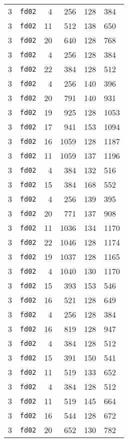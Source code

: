 \documentclass{article}
\begin{document}
\begin{table}[h!]
\begin{tabular}{llrrrl}
    3 & \texttt{fd02} & 4 & 256 & 128 & 384 \\
    3 & \texttt{fd02} & 11 & 512 & 138 & 650 \\
    3 & \texttt{fd02} & 20 & 640 & 128 & 768 \\
    3 & \texttt{fd02} & 4 & 256 & 128 & 384 \\
    3 & \texttt{fd02} & 22 & 384 & 128 & 512 \\
    3 & \texttt{fd02} & 4 & 256 & 140 & 396 \\
    3 & \texttt{fd02} & 20 & 791 & 140 & 931 \\
    3 & \texttt{fd02} & 19 & 925 & 128 & 1053 \\
    3 & \texttt{fd02} & 17 & 941 & 153 & 1094 \\
    3 & \texttt{fd02} & 16 & 1059 & 128 & 1187 \\
    3 & \texttt{fd02} & 11 & 1059 & 137 & 1196 \\
    3 & \texttt{fd02} & 4 & 384 & 132 & 516 \\
    3 & \texttt{fd02} & 15 & 384 & 168 & 552 \\
    3 & \texttt{fd02} & 4 & 256 & 139 & 395 \\
    3 & \texttt{fd02} & 20 & 771 & 137 & 908 \\
    3 & \texttt{fd02} & 11 & 1036 & 134 & 1170 \\
    3 & \texttt{fd02} & 22 & 1046 & 128 & 1174 \\
    3 & \texttt{fd02} & 19 & 1037 & 128 & 1165 \\
    3 & \texttt{fd02} & 4 & 1040 & 130 & 1170 \\
    3 & \texttt{fd02} & 15 & 393 & 153 & 546 \\
    3 & \texttt{fd02} & 16 & 521 & 128 & 649 \\
    3 & \texttt{fd02} & 4 & 256 & 128 & 384 \\
    3 & \texttt{fd02} & 16 & 819 & 128 & 947 \\
    3 & \texttt{fd02} & 4 & 384 & 128 & 512 \\
    3 & \texttt{fd02} & 15 & 391 & 150 & 541 \\
    3 & \texttt{fd02} & 11 & 519 & 133 & 652 \\
    3 & \texttt{fd02} & 4 & 384 & 128 & 512 \\
    3 & \texttt{fd02} & 11 & 519 & 145 & 664 \\
    3 & \texttt{fd02} & 16 & 544 & 128 & 672 \\
    3 & \texttt{fd02} & 20 & 652 & 130 & 782 \\

\end{tabular}
\end{table}
\end{document}

